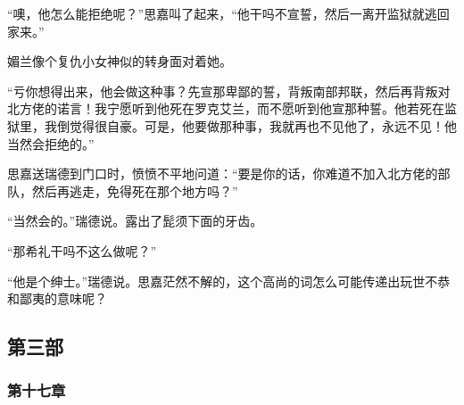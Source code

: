 \par “噢，他怎么能拒绝呢？”思嘉叫了起来，“他干吗不宣誓，然后一离开监狱就逃回家来。”
\par 媚兰像个复仇小女神似的转身面对着她。
\par “亏你想得出来，他会做这种事？先宣那卑鄙的誓，背叛南部邦联，然后再背叛对北方佬的诺言！我宁愿听到他死在罗克艾兰，而不愿听到他宣那种誓。他若死在监狱里，我倒觉得很自豪。可是，他要做那种事，我就再也不见他了，永远不见！他当然会拒绝的。”
\par 思嘉送瑞德到门口时，愤愤不平地问道：“要是你的话，你难道不加入北方佬的部队，然后再逃走，免得死在那个地方吗？”
\par “当然会的。”瑞德说。露出了髭须下面的牙齿。
\par “那希礼干吗不这么做呢？”
\par “他是个绅士。”瑞德说。思嘉茫然不解的，这个高尚的词怎么可能传递出玩世不恭和鄙夷的意味呢？

\subsection{第三部}


\subsubsection{第十七章}


